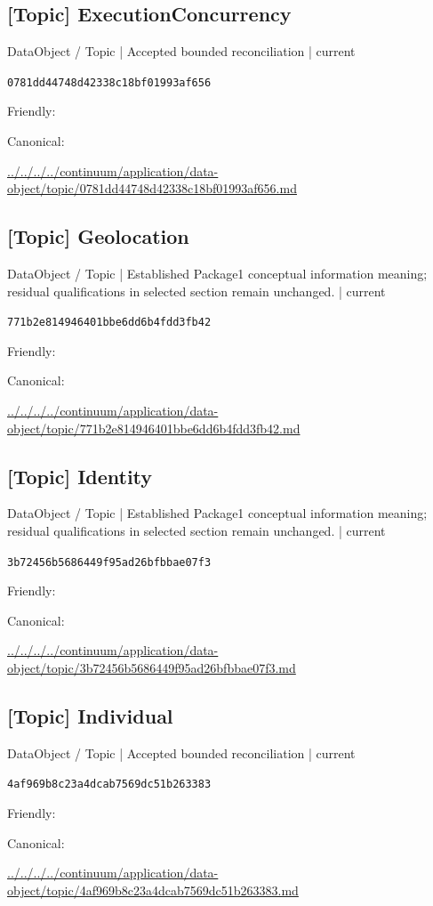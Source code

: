 \documentclass[10pt,a4paper]{article}
\begin{document}
\subsection*{[Topic] ExecutionConcurrency}
{\small DataObject / Topic | Accepted bounded reconciliation | current}\par
\texttt{0781dd44748d42338c18bf01993af656}\par
Friendly: \par
Canonical: \par
{\footnotesize\url{../../../../continuum/application/data-object/topic/0781dd44748d42338c18bf01993af656.md}}\par
\subsection*{[Topic] Geolocation}
{\small DataObject / Topic | Established Package1 conceptual information meaning; residual qualifications in selected section remain unchanged. | current}\par
\texttt{771b2e814946401bbe6dd6b4fdd3fb42}\par
Friendly: \par
Canonical: \par
{\footnotesize\url{../../../../continuum/application/data-object/topic/771b2e814946401bbe6dd6b4fdd3fb42.md}}\par
\subsection*{[Topic] Identity}
{\small DataObject / Topic | Established Package1 conceptual information meaning; residual qualifications in selected section remain unchanged. | current}\par
\texttt{3b72456b5686449f95ad26bfbbae07f3}\par
Friendly: \par
Canonical: \par
{\footnotesize\url{../../../../continuum/application/data-object/topic/3b72456b5686449f95ad26bfbbae07f3.md}}\par
\subsection*{[Topic] Individual}
{\small DataObject / Topic | Accepted bounded reconciliation | current}\par
\texttt{4af969b8c23a4dcab7569dc51b263383}\par
Friendly: \par
Canonical: \par
{\footnotesize\url{../../../../continuum/application/data-object/topic/4af969b8c23a4dcab7569dc51b263383.md}}\par
\end{document}
